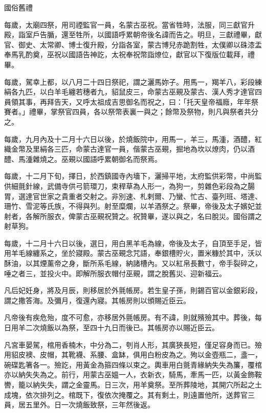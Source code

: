 \begin{pinyinscope}
 國俗舊禮



 每歲，太廟四祭，用司禋監官一員，名蒙古巫祝。當省牲時，法服，同三獻官升殿，詣室戶告腯，還至牲所，以國語呼累朝帝後名諱而告之。明旦，三獻禮畢，獻官、御史、太常卿、博士復升殿，分詣各室，蒙古博兒赤跪割牲，太僕卿以硃漆盂奉馬乳酌奠，巫祝以國語告神訖，太祝奉祝幣詣燎位，獻官以下復版位載拜，禮畢。



 每歲，駕幸上都，以八月二十四日祭祀，謂之灑馬妳子。用馬一，羯羊八，彩段練絹各九匹，以白羊毛纏若穗者九，貂鼠皮三，命蒙古巫覡及蒙古、漢人秀才達官四員領其事，再拜告天，又呼太祖成吉思御名而祝之，曰：「托天皇帝福廕，年年祭賽者。」禮畢，掌祭官四員，各以祭幣表裏一與之；餘幣及祭物，則凡與祭者共分之。



 每歲，九月內及十二月十六日以後，於燒飯院中，用馬一，羊三，馬湩，酒醴，紅織金幣及里絹各三匹，命蒙古達官一員，偕蒙古巫覡，掘地為坎以燎肉，仍以酒醴、馬湩雜燒之。巫覡以國語呼累朝御名而祭焉。



 每歲，十二月下旬，擇日，於西鎮國寺內墻下，灑掃平地，太府監供彩幣，中尚監供細氈針線，武備寺供弓箭環刀，束稈草為人形一，為狗一，剪雜色彩段為之腸胃，選達官世家之貴重者交射之。非別速、札剌爾、乃蠻、忙古、臺列班、塔達、珊竹、雪泥等氏族，不得與列。射至糜爛，以羊酒祭之。祭畢，帝後及太子嬪妃並射者，各解所服衣，俾蒙古巫覡祝贊之。祝贊畢，遂以與之，名曰脫災。國俗謂之射草狗。



 每歲，十二月十六日以後，選日，用白黑羊毛為線，帝後及太子，自頂至手足，皆用羊毛線纏系之，坐於寢殿。蒙古巫覡念咒語，奉銀槽貯火，置米糠於其中，沃以酥油，以其煙薰帝之身，斷所系毛線，納諸槽內。又以紅帛長數寸，帝手裂碎之，唾之者三，並投火中。即解所服衣帽付巫覡，謂之脫舊災、迎新福云。



 凡后妃妊身，將及月辰，則移居於外氈帳房。若生皇子孫，則錫百官以金銀彩段，謂之撒答海。及彌月，復還內寢。其帳房則以頒賜近臣云。



 凡帝後有疾危殆，度不可愈，亦移居外氈帳房。有不諱，則就殯殮其中。葬後，每日用羊二次燒飯以為祭，至四十九日而後已。其帳房亦以賜近臣云。



 凡宮車晏駕，棺用香楠木，中分為二，刳肖人形，其廣狹長短，僅足容身而已。殮用貂皮襖、皮帽，其靴襪、系腰、盒缽，俱用白粉皮為之。殉以金壺瓶二，盞一，碗碟匙箸各一。殮訖，用黃金為箍四條以束之。輿車用白氈青緣納失失為簾，覆棺亦以納失失為之。前行，用蒙古巫媼一人，衣新衣，騎馬，牽馬一匹，以黃金飾鞍轡，籠以納失失，謂之金靈馬。日三次，用羊奠祭。至所葬陵地，其開穴所起之土成塊，依次排列之。棺既下，復依次掩覆之。其有剩土，則遠置他所，送葬官三員，居五里外。日一次燒飯致祭，三年然後返。




\end{pinyinscope}
